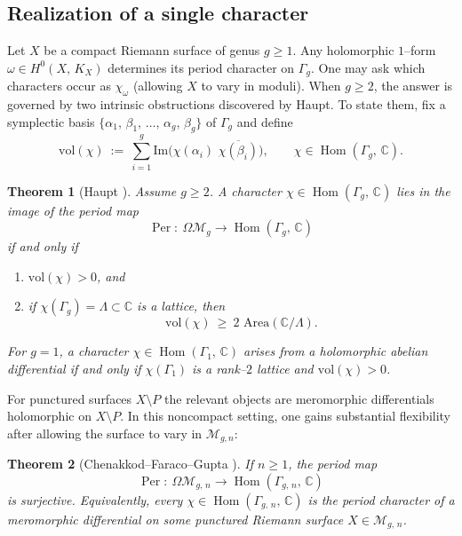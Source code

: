 \documentclass[a4paper,12pt]{amsart}
\newcommand{\C}{\mathbb{C}}
\newcommand{\Hom}{\operatorname{Hom}}
\newcommand{\Per}{\operatorname{Per}}
\newcommand{\Mgn}{\mathcal{M}_{g,n}}
\theoremstyle{plain}
\newtheorem{theorem}{Theorem}[section]
\theoremstyle{definition}
\begin{document}
\subsection{Realization of a single character}
Let $X$ be a compact Riemann surface of genus $g\ge 1$.
Any holomorphic $1$--form $\omega\in H^0(X,\, K_X)$ determines its period character on $\Gamma_g$.
One may ask which characters occur as $\chi_\omega$ (allowing $X$ to vary in moduli).
When $g\ge 2$, the answer is governed by two intrinsic obstructions discovered by Haupt.
To state them, fix a symplectic basis $\{\alpha_1,\, \beta_1,\, \dots,\, \alpha_g,\, \beta_g\}$ of $\Gamma_g$ and define
\[
\mathrm{vol}(\chi)\ :=\ \sum_{i=1}^g \mathrm{Im}\!\bigl(\chi(\alpha_i)\, \, \overline{\chi(\beta_i)}\bigr),
\qquad \chi\in\Hom(\Gamma_g,\, \C).
\]
\begin{theorem}[Haupt {\cite{Haupt}}]\label{thm:intro-haupt}
Assume $g\ge 2$.  A character $\chi\in\Hom(\Gamma_g,\, \C)$ lies in the image of the period map
\[
\Per:\ \Omega\mathcal{M}_g \longrightarrow \Hom(\Gamma_g,\, \C)
\]
if and only if
\begin{enumerate}[label=\textnormal{(\roman*)}, itemsep=2pt, topsep=2pt]
\item $\mathrm{vol}(\chi)>0$, and
\item if $\chi(\Gamma_g)=\Lambda\subset\C$ is a lattice, then
\[
\mathrm{vol}(\chi)\ \ge\ 2\,  \, \mathrm{Area}(\C/\Lambda).
\]
\end{enumerate}
For $g=1$, a character $\chi\in\Hom(\Gamma_1,\, \C)$ arises from a holomorphic abelian differential if and only if
$\chi(\Gamma_1)$ is a rank--$2$ lattice and $\mathrm{vol}(\chi)>0$.
\end{theorem}

For punctured surfaces $X\setminus P$ the relevant objects are meromorphic differentials holomorphic on $X\setminus P$.
In this noncompact setting, one gains substantial flexibility after allowing the surface to vary in $\Mgn$:

\begin{theorem}[Chenakkod--Faraco--Gupta {\cite[Theorem~A]{CFG}}]\label{thm:intro-cfg}
If $n\ge 1$, the period map
\[
\Per:\ \Omega\mathcal{M}_{g,\, n}\longrightarrow \Hom(\Gamma_{g,\, n},\, \C)
\]
is surjective.  Equivalently, every $\chi\in\Hom(\Gamma_{g,\, n},\, \C)$ is the period character of a meromorphic differential on
some punctured Riemann surface $X\in\mathcal{M}_{g,\, n}$.
\end{theorem}
\end{document}

